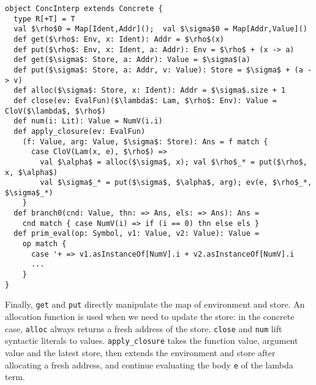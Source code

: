 \begin{lstlisting}
object ConcInterp extends Concrete {
  type R[+T] = T
  val $\rho$0 = Map[Ident,Addr]();  val $\sigma$0 = Map[Addr,Value]()
  def get($\rho$: Env, x: Ident): Addr = $\rho$(x)
  def put($\rho$: Env, x: Ident, a: Addr): Env = $\rho$ + (x -> a)
  def get($\sigma$: Store, a: Addr): Value = $\sigma$(a)
  def put($\sigma$: Store, a: Addr, v: Value): Store = $\sigma$ + (a -> v)
  def alloc($\sigma$: Store, x: Ident): Addr = $\sigma$.size + 1
  def close(ev: EvalFun)($\lambda$: Lam, $\rho$: Env): Value = CloV($\lambda$, $\rho$)
  def num(i: Lit): Value = NumV(i.i)
  def apply_closure(ev: EvalFun)
    (f: Value, arg: Value, $\sigma$: Store): Ans = f match {
      case CloV(Lam(x, e), $\rho$) =>
        val $\alpha$ = alloc($\sigma$, x); val $\rho$_* = put($\rho$, x, $\alpha$)
        val $\sigma$_* = put($\sigma$, $\alpha$, arg); ev(e, $\rho$_*, $\sigma$_*)
    }
  def branch0(cnd: Value, thn: => Ans, els: => Ans): Ans = 
    cnd match { case NumV(i) => if (i == 0) thn else els }
  def prim_eval(op: Symbol, v1: Value, v2: Value): Value = 
    op match {
      case '+ => v1.asInstanceOf[NumV].i + v2.asInstanceOf[NumV].i
      ...
    }
}
\end{lstlisting}

Finally, \texttt{get} and \texttt{put} directly manipulate the map of
environment and store. An allocation function is used when we need to update the
store: in the concrete case, \texttt{alloc} always returns a fresh address of
the store. \texttt{close} and \texttt{num} lift syntactic literals to values.
\texttt{apply\_closure} takes the function value, argument value and the latest
store, then extends the environment and store after allocating a fresh address,
and continue evaluating the body \texttt{e} of the lambda term.
